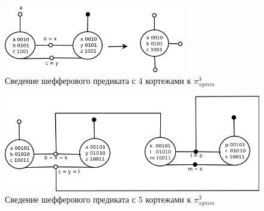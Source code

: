 \documentclass[12pt]{article}
\begin{document}
\begin{figure}[htb]
 \centering
\includegraphics[width=0.7\textwidth]{sch4.png}
\caption{Сведение шефферового предиката с 4 кортежами к $\pi_{symm}^3$ }
\label{fig:sheff4tosheff3}
\end{figure}

\begin{figure}[htb]
 \centering
\includegraphics[width=1.0\textwidth]{sch5.png}
\caption{Сведение шефферового предиката с 5 кортежами к $\pi_{symm}^3$ }
\label{fig:sheff5tosheff3}
\end{figure}


\end{document}
